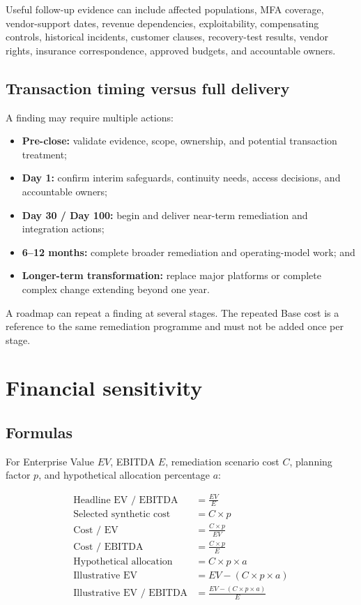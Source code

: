\documentclass[11pt,a4paper]{article}
\begin{document}
Useful follow-up evidence can include affected populations, MFA coverage, vendor-support dates, revenue dependencies, exploitability, compensating controls, historical incidents, customer clauses, recovery-test results, vendor rights, insurance correspondence, approved budgets, and accountable owners.

\subsection{Transaction timing versus full delivery}

A finding may require multiple actions:

\begin{itemize}
  \item \textbf{Pre-close:} validate evidence, scope, ownership, and potential transaction treatment;
  \item \textbf{Day 1:} confirm interim safeguards, continuity needs, access decisions, and accountable owners;
  \item \textbf{Day 30 / Day 100:} begin and deliver near-term remediation and integration actions;
  \item \textbf{6--12 months:} complete broader remediation and operating-model work; and
  \item \textbf{Longer-term transformation:} replace major platforms or complete complex change extending beyond one year.
\end{itemize}

A roadmap can repeat a finding at several stages. The repeated Base cost is a reference to the same remediation programme and must not be added once per stage.

\section{Financial sensitivity}

\subsection{Formulas}

For Enterprise Value $EV$, EBITDA $E$, remediation scenario cost $C$, planning factor $p$, and hypothetical allocation percentage $a$:

\begin{align*}
\text{Headline EV / EBITDA} &= \frac{EV}{E} \\
\text{Selected synthetic cost} &= C \times p \\
\text{Cost / EV} &= \frac{C \times p}{EV} \\
\text{Cost / EBITDA} &= \frac{C \times p}{E} \\
\text{Hypothetical allocation} &= C \times p \times a \\
\text{Illustrative EV} &= EV - (C \times p \times a) \\
\text{Illustrative EV / EBITDA} &= \frac{EV - (C \times p \times a)}{E}
\end{align*}
\end{document}
